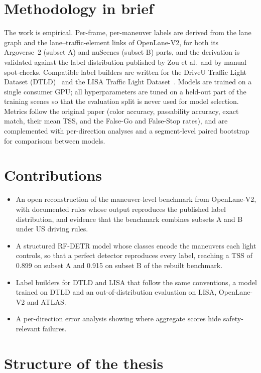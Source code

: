 \section*{Methodology in brief}

The work is empirical. Per-frame, per-maneuver labels are derived from the lane graph and the
lane--traffic-element links of OpenLane-V2, for both its Argoverse~2 (subset A) and nuScenes (subset
B) parts, and the derivation is validated against the label distribution published by Zou et al.\
and by manual spot-checks. Compatible label builders are written for the DriveU Traffic Light Dataset
(DTLD)~\cite{fregin2018dtld} and the LISA Traffic Light Dataset~\cite{jensen2016vision}. Models are
trained on a single consumer GPU; all hyperparameters are tuned on a held-out part of the training
scenes so that the evaluation split is never used for model selection. Metrics follow the original
paper (color accuracy, passability accuracy, exact match, their mean TSS, and the False-Go and
False-Stop rates), and are complemented with per-direction analyses and a segment-level paired
bootstrap for comparisons between models.

\section*{Contributions}

\begin{itemize}
  \item An open reconstruction of the maneuver-level benchmark from OpenLane-V2, with documented rules
        whose output reproduces the published label distribution, and evidence that the benchmark
        combines subsets A and B under US driving rules.
  \item A structured RF-DETR model whose classes encode the maneuvers each light controls, so that a
        perfect detector reproduces every label, reaching a TSS of 0.899 on subset A and 0.915 on
        subset B of the rebuilt benchmark.
  \item Label builders for DTLD and LISA that follow the same conventions, a model trained on DTLD and
        an out-of-distribution evaluation on LISA, OpenLane-V2 and ATLAS.
  \item A per-direction error analysis showing where aggregate scores hide safety-relevant failures.
\end{itemize}

\section*{Structure of the thesis}

